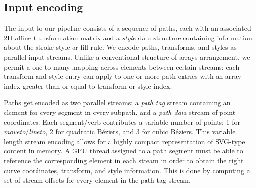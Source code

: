 \documentclass[sigconf, authordraft]{acmart}
\begin{document}


\subsection{Input encoding}

The input to our pipeline consists of a sequence of paths, each with an associated 2D affine transformation matrix and a \emph{style} data structure containing information about the stroke style or fill rule. We encode paths, transforms, and styles as parallel input streams. Unlike a conventional structure-of-arrays arrangement, we permit a one-to-many mapping across elements between certain streams: each transform and style entry can apply to one or more path entries with an array index greater than or equal to transform or style index.

Paths get encoded as two parallel streams: a \emph{path tag} stream containing an element for every segment in every subpath, and a \emph{path data} stream of point coordinates. Each segment/verb contributes a variable number of points: 1 for \emph{moveto}/\emph{lineto}, 2 for quadratic Béziers, and 3 for cubic Béziers. This variable length stream encoding allows for a highly compact representation of SVG-type content in memory. A GPU thread assigned to a path segment must be able to reference the corresponding element in each stream in order to obtain the right curve coordinates, transform, and style information. This is done by computing a set of stream offsets for every element in the path tag stream.

\end{document}
